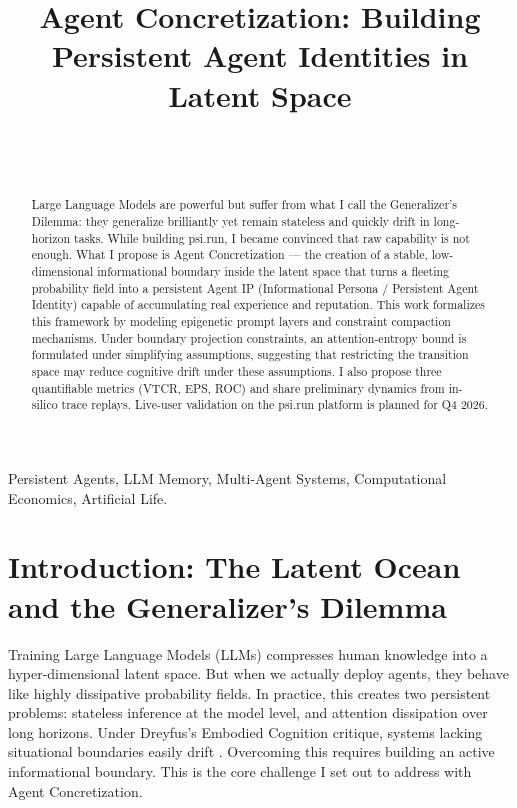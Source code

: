\documentclass[10pt,journal,compsoc]{IEEEtran}
\begin{document}
\title{Agent Concretization: Building Persistent Agent Identities in Latent Space}

\author{
     \\
     \\
}

\maketitle

\begin{abstract}
Large Language Models are powerful but suffer from what I call the Generalizer's Dilemma: they generalize brilliantly yet remain stateless and quickly drift in long-horizon tasks. While building psi.run, I became convinced that raw capability is not enough. What I propose is Agent Concretization --- the creation of a stable, low-dimensional informational boundary inside the latent space that turns a fleeting probability field into a persistent Agent IP (Informational Persona / Persistent Agent Identity) capable of accumulating real experience and reputation. This work formalizes this framework by modeling epigenetic prompt layers and constraint compaction mechanisms. Under boundary projection constraints, an attention-entropy bound is formulated under simplifying assumptions, suggesting that restricting the transition space may reduce cognitive drift under these assumptions. I also propose three quantifiable metrics (VTCR, EPS, ROC) and share preliminary dynamics from in-silico trace replays. Live-user validation on the psi.run platform is planned for Q4 2026.
\end{abstract}

\begin{IEEEkeywords}
Persistent Agents, LLM Memory, Multi-Agent Systems, Computational Economics, Artificial Life.
\end{IEEEkeywords}

\section{Introduction: The Latent Ocean and the Generalizer's Dilemma}
Training Large Language Models (LLMs) compresses human knowledge into a hyper-dimensional latent space. But when we actually deploy agents, they behave like highly dissipative probability fields. In practice, this creates two persistent problems: stateless inference at the model level, and attention dissipation over long horizons. Under Dreyfus's Embodied Cognition critique, systems lacking situational boundaries easily drift \cite[p.156]{dreyfus1972}. Overcoming this requires building an active informational boundary. This is the core challenge I set out to address with Agent Concretization.
\end{document}
